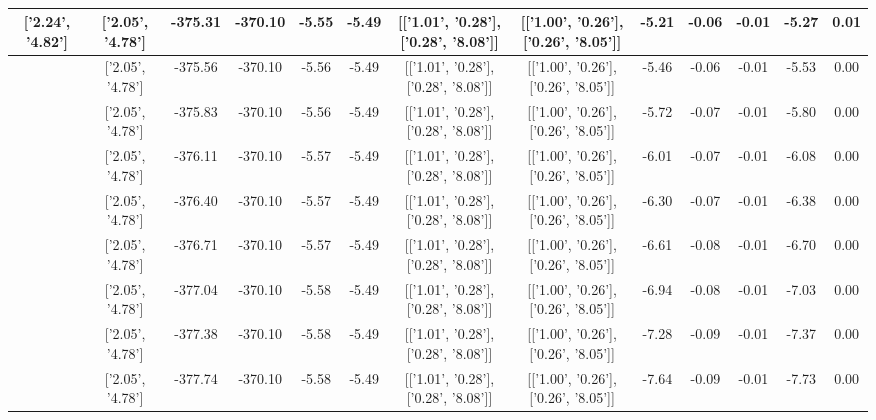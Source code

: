 \begin{table}[htbp]
\begin{adjustbox}{angle=90}
\begin{tabular}{|c|c|c|c|c|c|c|c|c|c|c|c|c|}
 ['2.24', '4.82'] & ['2.05', '4.78'] & -375.31 & -370.10 & -5.55 & -5.49 & [['1.01', '0.28'], ['0.28', '8.08']] & [['1.00', '0.26'], ['0.26', '8.05']] & -5.21 & -0.06 & -0.01 & -5.27 & 0.01\\ \hline
 ['2.25', '4.82'] & ['2.05', '4.78'] & -375.56 & -370.10 & -5.56 & -5.49 & [['1.01', '0.28'], ['0.28', '8.08']] & [['1.00', '0.26'], ['0.26', '8.05']] & -5.46 & -0.06 & -0.01 & -5.53 & 0.00\\ \hline
 ['2.26', '4.83'] & ['2.05', '4.78'] & -375.83 & -370.10 & -5.56 & -5.49 & [['1.01', '0.28'], ['0.28', '8.08']] & [['1.00', '0.26'], ['0.26', '8.05']] & -5.72 & -0.07 & -0.01 & -5.80 & 0.00\\ \hline
 ['2.27', '4.83'] & ['2.05', '4.78'] & -376.11 & -370.10 & -5.57 & -5.49 & [['1.01', '0.28'], ['0.28', '8.08']] & [['1.00', '0.26'], ['0.26', '8.05']] & -6.01 & -0.07 & -0.01 & -6.08 & 0.00\\ \hline
 ['2.29', '4.83'] & ['2.05', '4.78'] & -376.40 & -370.10 & -5.57 & -5.49 & [['1.01', '0.28'], ['0.28', '8.08']] & [['1.00', '0.26'], ['0.26', '8.05']] & -6.30 & -0.07 & -0.01 & -6.38 & 0.00\\ \hline
 ['2.30', '4.83'] & ['2.05', '4.78'] & -376.71 & -370.10 & -5.57 & -5.49 & [['1.01', '0.28'], ['0.28', '8.08']] & [['1.00', '0.26'], ['0.26', '8.05']] & -6.61 & -0.08 & -0.01 & -6.70 & 0.00\\ \hline
 ['2.31', '4.84'] & ['2.05', '4.78'] & -377.04 & -370.10 & -5.58 & -5.49 & [['1.01', '0.28'], ['0.28', '8.08']] & [['1.00', '0.26'], ['0.26', '8.05']] & -6.94 & -0.08 & -0.01 & -7.03 & 0.00\\ \hline
 ['2.32', '4.84'] & ['2.05', '4.78'] & -377.38 & -370.10 & -5.58 & -5.49 & [['1.01', '0.28'], ['0.28', '8.08']] & [['1.00', '0.26'], ['0.26', '8.05']] & -7.28 & -0.09 & -0.01 & -7.37 & 0.00\\ \hline
 ['2.33', '4.84'] & ['2.05', '4.78'] & -377.74 & -370.10 & -5.58 & -5.49 & [['1.01', '0.28'], ['0.28', '8.08']] & [['1.00', '0.26'], ['0.26', '8.05']] & -7.64 & -0.09 & -0.01 & -7.73 & 0.00\\ \hline
            \end{tabular}
        \end{adjustbox}
        \caption{}
        \label{}
    \end{table}
    